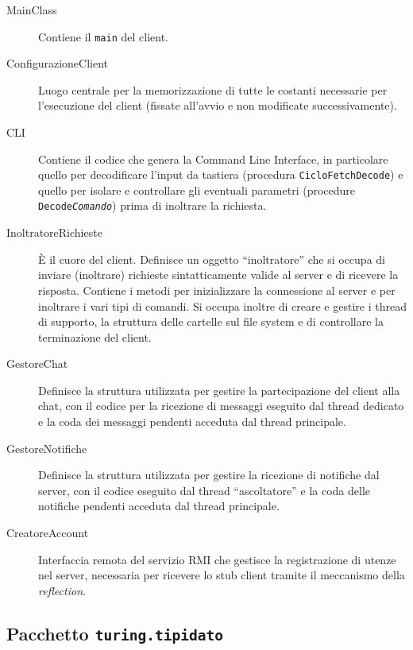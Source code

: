\documentclass[a4paper,12pt]{article}
\begin{document}
   \begin{description}
  \item[MainClass] Contiene il \texttt{main} del client.
  
  \item[ConfigurazioneClient] Luogo centrale per la memorizzazione di tutte le costanti necessarie per l'esecuzione del client (fissate all'avvio e non modificate successivamente).
  
  \item[CLI] Contiene il codice che genera la Command Line Interface, in particolare quello per decodificare l'input da tastiera (procedura \texttt{CicloFetchDecode}) e quello per isolare e controllare gli eventuali parametri (procedure \texttt{Decode\textit{Comando}}) prima di inoltrare la richiesta.
  
  \item[InoltratoreRichieste] \`{E} il cuore del client. Definisce un oggetto ``inoltratore'' che si occupa di inviare (inoltrare) richieste sintatticamente valide al server e di ricevere la risposta. Contiene i metodi per inizializzare la connessione al server e per inoltrare i vari tipi di comandi. Si occupa inoltre di creare e gestire i thread di supporto, la struttura delle cartelle sul file system e di controllare la terminazione del client.
  
  \item[GestoreChat] Definisce la struttura utilizzata per gestire la partecipazione del client alla chat, con il codice per la ricezione di messaggi eseguito dal thread dedicato e la coda dei messaggi pendenti acceduta dal thread principale.
  
  \item[GestoreNotifiche] Definisce la struttura utilizzata per gestire la ricezione di notifiche dal server, con il codice eseguito dal thread ``ascoltatore'' e la coda delle notifiche pendenti acceduta dal thread principale.
  
  \item[CreatoreAccount] Interfaccia remota del servizio RMI che gestisce la registrazione di utenze nel server, necessaria per ricevere lo stub client tramite il meccanismo della \textit{reflection}.
 \end{description}
 
 \subsection{ Pacchetto \texttt{turing.tipidato} }
 
\end{document}
